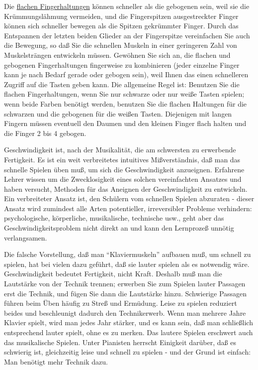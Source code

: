 Die \hyperlink{c1iii4b}{flachen Fingerhaltungen} können schneller als die gebogenen sein, weil sie die Krümmungslähmung vermeiden, und die Fingerspitzen ausgestreckter Finger können sich schneller bewegen als die Spitzen gekrümmter Finger.
Durch das Entspannen der letzten beiden Glieder an der Fingerspitze vereinfachen Sie auch die Bewegung, so daß Sie die schnellen Muskeln in einer geringeren Zahl von Muskelsträngen entwickeln müssen.
Gewöhnen Sie sich an, die flachen und gebogenen Fingerhaltungen fingerweise zu kombinieren (jeder einzelne Finger kann je nach Bedarf gerade oder gebogen sein), weil Ihnen das einen schnelleren Zugriff auf die Tasten geben kann.
Die allgemeine Regel ist: Benutzen Sie die flachen Fingerhaltungen, wenn Sie nur schwarze oder nur weiße Tasten spielen; wenn beide Farben benötigt werden, benutzen Sie die flachen Haltungen für die schwarzen und die gebogenen für die weißen Tasten.
Diejenigen mit langen Fingern müssen eventuell den Daumen und den kleinen Finger flach halten und die Finger 2 bis 4 gebogen.

Geschwindigkeit ist, nach der Musikalität, die am schwersten zu erwerbende Fertigkeit.
Es ist ein weit verbreitetes intuitives Mißverständnis, daß man das schnelle Spielen üben muß, um sich die Geschwindigkeit anzueignen.
Erfahrene Lehrer wissen um die Zwecklosigkeit eines solchen vereinfachten Ansatzes und haben versucht, Methoden für das Aneignen der Geschwindigkeit zu entwickeln.
Ein verbreiteter Ansatz ist, den Schülern vom schnellen Spielen abzuraten - dieser Ansatz wird zumindest alle Arten potentieller, irreversibler Probleme verhindern: psychologische, körperliche, musikalische, technische usw., geht aber das Geschwindigkeitsproblem nicht direkt an und kann den Lernprozeß unnötig verlangsamen.

Die falsche Vorstellung, daß man \enquote{Klaviermuskeln} aufbauen muß, um schnell zu spielen, hat bei vielen dazu geführt, daß sie lauter spielen als es notwendig wäre.
Geschwindigkeit bedeutet Fertigkeit, nicht Kraft.
Deshalb muß man die Lautstärke von der Technik trennen; erwerben Sie zum Spielen lauter Passagen erst die Technik, und fügen Sie dann die Lautstärke hinzu.
Schwierige Passagen führen beim Üben häufig zu Streß und Ermüdung.
Leise zu spielen reduziert beides und beschleunigt dadurch den Technikerwerb.
Wenn man mehrere Jahre Klavier spielt, wird man jedes Jahr stärker, und es kann sein, daß man schließlich entsprechend lauter spielt, ohne es zu merken.
Das lautere Spielen erschwert auch das musikalische Spielen.
Unter Pianisten herrscht Einigkeit darüber, daß es schwierig ist, gleichzeitig leise und schnell zu spielen - und der Grund ist einfach: Man benötigt mehr Technik dazu.

